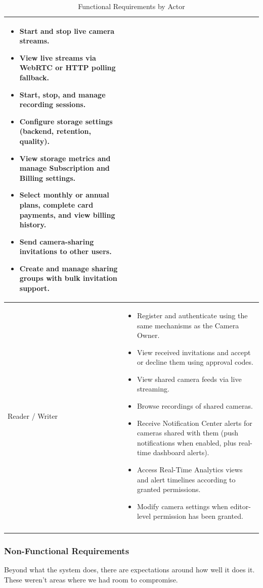 \documentclass[12pt,a4paper,oneside]{report}
\newlength{\TblTwoKeyW}
\newlength{\TblTwoValW}
\begin{document}
\begin{longtable}{|>{\bfseries\small\raggedright\arraybackslash}p{\TblTwoKeyW}|>{\raggedright\arraybackslash}p{\TblTwoValW}|}
\begin{itemize}[nosep,leftmargin=1em]
  \item Start and stop live camera streams.
  \item View live streams via WebRTC or HTTP polling fallback.
  \item Start, stop, and manage recording sessions.
  \item Configure storage settings (backend, retention, quality).
  \item View storage metrics and manage Subscription and Billing settings.
  \item Select monthly or annual plans, complete card payments, and view billing history.
  \item Send camera-sharing invitations to other users.
  \item Create and manage sharing groups with bulk invitation support.
\end{itemize} \\
\hline
Reader / Writer &
\begin{itemize}[nosep,leftmargin=1em]
  \item Register and authenticate using the same mechanisms as the Camera Owner.
  \item View received invitations and accept or decline them using approval codes.
  \item View shared camera feeds via live streaming.
  \item Browse recordings of shared cameras.
  \item Receive Notification Center alerts for cameras shared with them (push notifications when enabled, plus real-time dashboard alerts).
  \item Access Real-Time Analytics views and alert timelines according to granted permissions.
  \item Modify camera settings when editor-level permission has been granted.
\end{itemize} \\
\hline
\caption{Functional Requirements by Actor}
\label{tab:functional_requirements}
\end{longtable}

\subsubsection{Non-Functional Requirements}
\hspace{0.8cm}Beyond what the system does, there are expectations around how well it does it. These weren't areas where we had room to compromise.
\end{document}
